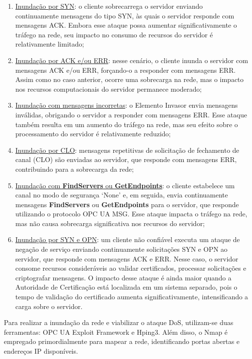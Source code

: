         \begin{enumerate}
            \item \underline{Inundação por SYN}: o cliente sobrecarrega o servidor enviando continuamente mensagens do tipo SYN, às quais o servidor responde com mensagens ACK. Embora esse ataque possa aumentar significativamente o tráfego na rede, seu impacto no consumo de recursos do servidor é relativamente limitado;
            \item \underline{Inundação por ACK e/ou ERR}: nesse cenário, o cliente inunda o servidor com mensagens ACK e/ou ERR, forçando-o a responder com mensagens ERR. Assim como no caso anterior, ocorre uma sobrecarga na rede, mas o impacto nos recursos computacionais do servidor permanece moderado;
            \item \underline{Inundação com mensagens incorretas}: o Elemento Invasor envia mensagens inválidas, obrigando o servidor a responder com mensagens ERR. Esse ataque também resulta em um aumento do tráfego na rede, mas seu efeito sobre o processamento do servidor é relativamente reduzido;
            \item \underline{Inundação por CLO}: mensagens repetitivas de solicitação de fechamento de canal (CLO) são enviadas ao servidor, que responde com mensagens ERR, contribuindo para a sobrecarga da rede;
            \item \underline{Inundação com \textbf{FindServers} ou \textbf{GetEndpoints}}: o cliente estabelece um canal no modo de segurança `None' e, em seguida, envia continuamente mensagens \textbf{FindServers} ou \textbf{GetEndpoints} para o servidor, que responde utilizando o protocolo OPC UA MSG. Esse ataque impacta o tráfego na rede, mas não causa sobrecarga significativa nos recursos do servidor;
            \item \underline{Inundação por SYN e OPN}: um cliente não confiável executa um ataque de negação de serviço enviando continuamente solicitações SYN e OPN ao servidor, que responde com mensagens ACK e ERR. Nesse caso, o servidor consome recursos consideráveis ao validar certificados, processar solicitações e criptografar mensagens. O impacto desse ataque é ainda maior quando a Autoridade de Certificação está localizada em um sistema separado, pois o tempo de validação do certificado aumenta significativamente, intensificando a carga sobre o servidor.
        \end{enumerate}

        Para realizar a inundação da rede e viabilizar o ataque DoS, utilizam-se duas ferramentas: OPC UA Exploit Framework e Hping3. Além disso, o Nmap é empregado primordialmente para mapear a rede, identificando portas abertas e endereços IP disponíveis.

